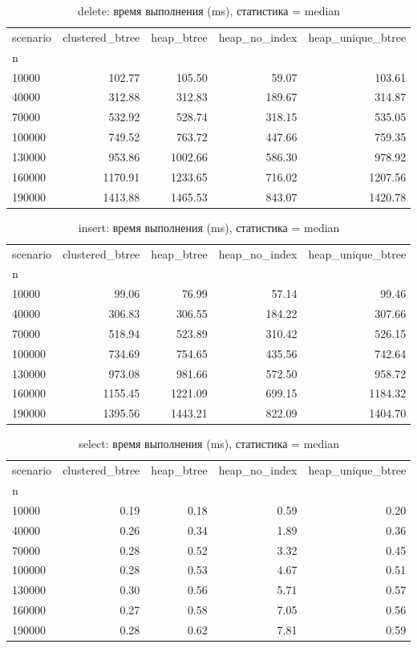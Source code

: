 \begin{table}
\caption{delete: время выполнения (ms), статистика = median}
\label{tab:delete_median}
\begin{tabular}{lrrrr}
\toprule
scenario & clustered\_btree & heap\_btree & heap\_no\_index & heap\_unique\_btree \\
n &  &  &  &  \\
\midrule
10000 & 102.77 & 105.50 & 59.07 & 103.61 \\
40000 & 312.88 & 312.83 & 189.67 & 314.87 \\
70000 & 532.92 & 528.74 & 318.15 & 535.05 \\
100000 & 749.52 & 763.72 & 447.66 & 759.35 \\
130000 & 953.86 & 1002.66 & 586.30 & 978.92 \\
160000 & 1170.91 & 1233.65 & 716.02 & 1207.56 \\
190000 & 1413.88 & 1465.53 & 843.07 & 1420.78 \\
\bottomrule
\end{tabular}
\end{table}


\begin{table}
\caption{insert: время выполнения (ms), статистика = median}
\label{tab:insert_median}
\begin{tabular}{lrrrr}
\toprule
scenario & clustered\_btree & heap\_btree & heap\_no\_index & heap\_unique\_btree \\
n &  &  &  &  \\
\midrule
10000 & 99.06 & 76.99 & 57.14 & 99.46 \\
40000 & 306.83 & 306.55 & 184.22 & 307.66 \\
70000 & 518.94 & 523.89 & 310.42 & 526.15 \\
100000 & 734.69 & 754.65 & 435.56 & 742.64 \\
130000 & 973.08 & 981.66 & 572.50 & 958.72 \\
160000 & 1155.45 & 1221.09 & 699.15 & 1184.32 \\
190000 & 1395.56 & 1443.21 & 822.09 & 1404.70 \\
\bottomrule
\end{tabular}
\end{table}


\begin{table}
\caption{select: время выполнения (ms), статистика = median}
\label{tab:select_median}
\begin{tabular}{lrrrr}
\toprule
scenario & clustered\_btree & heap\_btree & heap\_no\_index & heap\_unique\_btree \\
n &  &  &  &  \\
\midrule
10000 & 0.19 & 0.18 & 0.59 & 0.20 \\
40000 & 0.26 & 0.34 & 1.89 & 0.36 \\
70000 & 0.28 & 0.52 & 3.32 & 0.45 \\
100000 & 0.28 & 0.53 & 4.67 & 0.51 \\
130000 & 0.30 & 0.56 & 5.71 & 0.57 \\
160000 & 0.27 & 0.58 & 7.05 & 0.56 \\
190000 & 0.28 & 0.62 & 7.81 & 0.59 \\
\bottomrule
\end{tabular}
\end{table}
